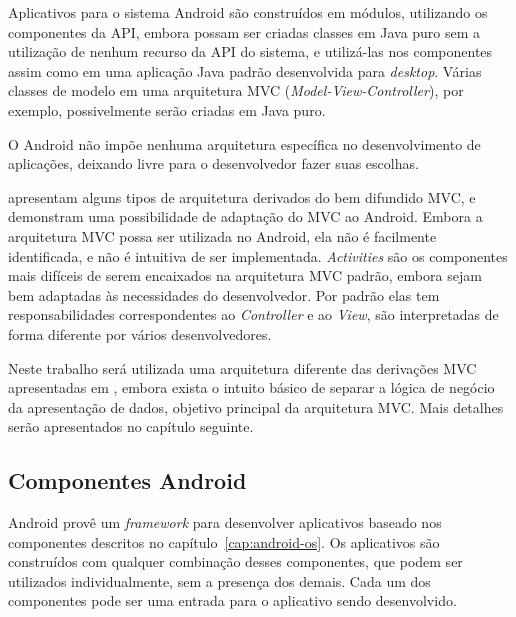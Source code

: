 Aplicativos para o sistema Android são construídos em módulos, utilizando os componentes da API, embora possam ser criadas classes em Java puro sem a utilização de nenhum recurso da API do sistema, e utilizá-las nos componentes assim como em uma aplicação Java padrão desenvolvida para \textit{desktop}. Várias classes de modelo em uma arquitetura MVC (\textit{Model-View-Controller}), por exemplo, possivelmente serão criadas em Java puro.

O Android não impõe nenhuma arquitetura específica no desenvolvimento de aplicações, deixando livre para o desenvolvedor fazer suas escolhas.

 apresentam alguns tipos de arquitetura derivados do bem difundido MVC, e demonstram uma possibilidade de adaptação do MVC ao Android. Embora a arquitetura MVC possa ser utilizada no Android, ela não é facilmente identificada, e não é intuitiva de ser implementada. \textit{Activities} são os componentes mais difíceis de serem encaixados na arquitetura MVC padrão, embora sejam bem adaptadas às necessidades do desenvolvedor. Por padrão elas tem responsabilidades correspondentes ao \textit{Controller} e ao \textit{View}, são interpretadas de forma diferente por vários desenvolvedores.

Neste trabalho será utilizada uma arquitetura diferente das derivações MVC apresentadas em , embora exista o intuito básico de separar a lógica de negócio da apresentação de dados, objetivo principal da arquitetura MVC. Mais detalhes serão apresentados no capítulo seguinte.

\subsection{Componentes Android}

Android provê um \textit{framework} para desenvolver aplicativos baseado nos componentes descritos no capítulo~\ref{cap:android-os}. Os aplicativos são construídos com qualquer combinação desses componentes, que podem ser utilizados individualmente, sem a presença dos demais. Cada um dos componentes pode ser uma entrada para o aplicativo sendo desenvolvido.

